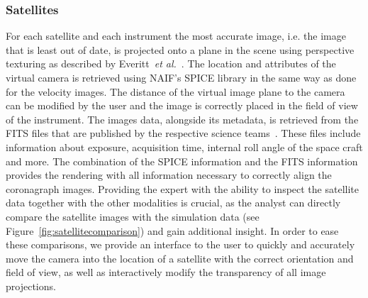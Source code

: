 \documentclass[journal]{vgtc}                %
\def\etal{\textit{et al.}}
\def\etal{\textit{et al.}}
\begin{document}
\subsubsection{Satellites} \label{sec:satelltes}
For each satellite and each instrument the most accurate image, i.e. the image that is least out of date, is projected onto a plane in the scene using perspective texturing as described by Everitt~\etal~\cite{Everitt:2001tg}. The location and attributes of the virtual camera is retrieved using NAIF's SPICE library in the same way as done for the velocity images. The distance of the virtual image plane to the camera can be modified by the user and the image is correctly placed in the field of view of the instrument. The images data, alongside its metadata, is retrieved from the FITS files that are published by the respective science teams~\cite{wells1981fits}. These files include information about exposure, acquisition time, internal roll angle of the space craft and more. The combination of the SPICE information and the FITS information provides the rendering with all information necessary to correctly align the coronagraph images. Providing the expert with the ability to inspect the satellite data together with the other modalities is crucial, as the analyst can directly compare the satellite images with the simulation data (see Figure~\ref{fig:satellitecomparison}) and gain additional insight. In order to ease these comparisons, we provide an interface to the user to quickly and accurately move the camera into the location of a satellite with the correct orientation and field of view, as well as interactively modify the transparency of all image projections.


\end{document}
